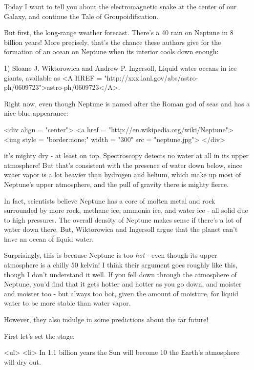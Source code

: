 

Today I want to tell you about the electromagnetic snake at the center
of our Galaxy, and continue the Tale of Groupoidification.  

But first, the long-range weather forecast.  There's a 40%
rain on Neptune in 8 billion years!  More precisely, that's the chance
these authors give for the formation of an ocean on Neptune when its
interior cools down enough:

1) Sloane J. Wiktorowica and Andrew P. Ingersoll, Liquid water oceans
in ice giants, available as <A HREF =
"http://xxx.lanl.gov/abs/astro-ph/0609723">astro-ph/0609723</A>.

Right now, even though Neptune is named after the Roman god of seas
and has a nice blue appearance:

<div align = "center">
<a href = "http://en.wikipedia.org/wiki/Neptune">
<img style = "border:none;" width = "300" src = "neptune.jpg">
</div>

it's mighty dry - at least on top.  Spectroscopy detects no water at
all in its upper atmosphere!  But that's consistent with the presence
of water down below, since water vapor is a lot heavier than hydrogen
and helium, which make up most of Neptune's upper atmosphere, and the
pull of gravity there is mighty fierce.

In fact, scientists believe Neptune has a core of molten metal and 
rock surrounded by more rock, methane ice, ammonia ice, and water 
ice - all solid due to high pressures.  The overall density of Neptune 
makes sense if there's a lot of water down there.  But, Wiktorowica 
and Ingersoll argue that the planet can't have an ocean of liquid water. 

Surprisingly, this is because Neptune is too \emph{hot} - even though its 
upper atmosphere is a chilly 50 kelvin!  I think their argument goes
roughly like this, though I don't understand it well.  If you fell 
down through the atmosphere of Neptune, you'd find that it gets 
hotter and hotter as you go down, and moister and moister too - but 
always too hot, given the amount of moisture, for liquid water to be 
more stable than water vapor.  

However, they also indulge in some predictions about the far future!

First let's set the stage:

<ul>
<li>
In 1.1 billion years the Sun will become 10%
the Earth's atmosphere will dry out.

